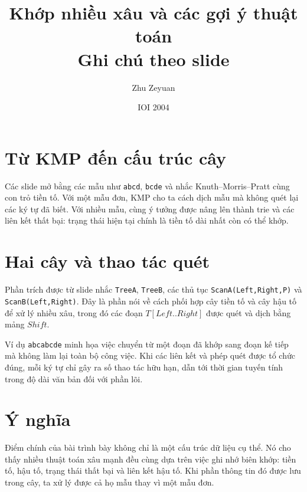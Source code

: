 \documentclass[11pt]{article}
\title{Khớp nhiều xâu và các gợi ý thuật toán\\{\large Ghi chú theo slide}}
\author{Zhu Zeyuan}
\date{IOI 2004}
\begin{document}
\maketitle


\section{Từ KMP đến cấu trúc cây}

Các slide mở bằng các mẫu như \texttt{abcd}, \texttt{bcde} và nhắc
Knuth--Morris--Pratt cùng con trỏ tiền tố. Với một mẫu đơn, KMP cho ta cách
dịch mẫu mà không quét lại các ký tự đã biết. Với nhiều mẫu, cùng ý tưởng
được nâng lên thành trie và các liên kết thất bại: trạng thái hiện tại chính
là tiền tố dài nhất còn có thể khớp.

\section{Hai cây và thao tác quét}

Phần trích được từ slide nhắc \texttt{TreeA}, \texttt{TreeB}, các thủ tục
\texttt{ScanA(Left,Right,P)} và \texttt{ScanB(Left,Right)}. Đây là phần nói
về cách phối hợp cây tiền tố và cây hậu tố để xử lý nhiều xâu, trong đó các
đoạn \(T[\mathit{Left}..\mathit{Right}]\) được quét và dịch bằng mảng
\(\mathit{Shift}\).

Ví dụ \texttt{abcabcde} minh họa việc chuyển từ một đoạn đã khớp sang đoạn
kế tiếp mà không làm lại toàn bộ công việc. Khi các liên kết và phép quét
được tổ chức đúng, mỗi ký tự chỉ gây ra số thao tác hữu hạn, dẫn tới thời
gian tuyến tính trong độ dài văn bản đối với phần lõi.

\section{Ý nghĩa}

Điểm chính của bài trình bày không chỉ là một cấu trúc dữ liệu cụ thể. Nó cho
thấy nhiều thuật toán xâu mạnh đều cùng dựa trên việc ghi nhớ biên khớp:
tiền tố, hậu tố, trạng thái thất bại và liên kết hậu tố. Khi phần thông tin
đó được lưu trong cây, ta xử lý được cả họ mẫu thay vì một mẫu đơn.
\end{document}
